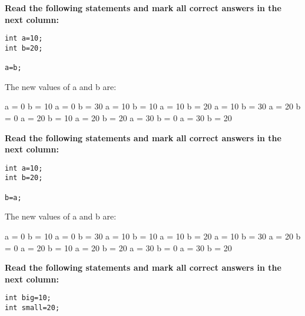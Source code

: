 \documentclass[10pt]{exam}
\begin{document}
\begin{questions}
\vspace{1cm}  \begin{minipage}[t][][t]{0.18\textwidth}
    \question \bf Read the following statements and mark all correct answers in the next column: \raggedright
    \begin{lstlisting}
int a=10;
int b=20;

a=b;    
    \end{lstlisting}
  \end{minipage}
  \hfill
  \begin{minipage}[t][][t]{0.75\textwidth}
    The new values of a and b are:
    \begin{multicols*}{3}
\begin{checkboxes}
      \choice a = 0 b = 10
      \choice a = 0 b = 30
      \choice a = 10 b = 10
      \choice a = 10 b = 20
      \choice a = 10 b = 30
      \choice a = 20 b = 0
      \choice a = 20 b = 10
      \choice a = 20 b = 20
      \choice a = 30 b = 0
      \choice a = 30 b = 20
    \end{checkboxes}
\end{multicols*}
  \end{minipage}

\vspace{1cm}  \begin{minipage}[t][][t]{0.18\textwidth}
    \question \bf Read the following statements and mark all correct answers in the next column: \raggedright
    \begin{lstlisting}
int a=10;
int b=20;

b=a;
  \end{lstlisting}
\end{minipage}
  \hfill
\begin{minipage}[t][][t]{0.75\textwidth}
  The new values of a and b are:
  \begin{multicols*}{3}
\begin{checkboxes}
    \choice a = 0 b = 10
    \choice a = 0 b = 30
    \choice a = 10 b = 10
    \choice a = 10 b = 20
    \choice a = 10 b = 30
    \choice a = 20 b = 0
    \choice a = 20 b = 10
    \choice a = 20 b = 20
    \choice a = 30 b = 0
    \choice a = 30 b = 20
  \end{checkboxes}
\end{multicols*}
\end{minipage}

\vspace{1cm}  \begin{minipage}[t][][t]{0.18\textwidth}
\question \bf Read the following statements and mark all correct answers in the next column: \raggedright
  \begin{lstlisting}
int big=10;
int small=20;


\end{lstlisting}
\end{minipage}
\end{questions}
\end{document}

